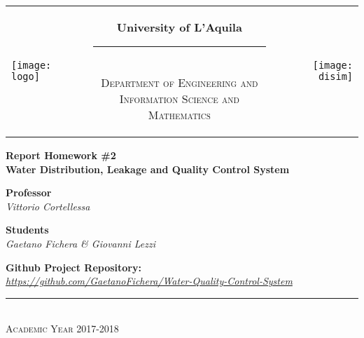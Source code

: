 \begin{titlepage}
\begin{center}
\normalsize

\begin{center}

\begin{tabular}[t]{@{} l @{} c @{} r @{}}
\parbox[c]{0.15\textwidth}{\raggedright \texttt{[image: logo]}}
&
\parbox[c]{0.7\textwidth}
{
\centering \bfseries
University of L'Aquila \\[-5pt]
\rule{0.6\textwidth}{1pt} \\
{\centering \scshape \small Department of Engineering and \\Information Science and Mathematics} \\}
&
\parbox[c]{0.15\textwidth}{\raggedleft \texttt{[image: disim]}}
\end{tabular}
\end{center}

\bigskip \bigskip



\bigskip
\bigskip

\vfil

{\bfseries \Large
Report Homework \#2 \\}
\bigskip
{\bfseries \Large
Water Distribution, Leakage and Quality Control System
}

{\large
\bigskip
\bigskip
\bigskip
\bigskip
{\bfseries \large Professor \\ }
\bigskip
\textit{Vittorio Cortellessa} \\
}

{\large
\bigskip
\bigskip
\bigskip
\bigskip
{\bfseries \large Students \\ }
\bigskip
\textit{Gaetano Fichera \& Giovanni Lezzi} \\
}

\vfil
\vfil

\vspace{2\baselineskip}

{\large
\bigskip
\bigskip
\bigskip
\bigskip
{\bfseries \large Github Project Repository: \\ }
\bigskip
\textit{\href{https://github.com/GaetanoFichera/Water-Quality-Control-System}{https://github.com/GaetanoFichera/Water-Quality-Control-System}} \\
}

\vfil \vfil \vfil

\rule{\textwidth}{1pt}\\
{\scshape Academic Year 2017-2018}

\end{center}
\end{titlepage}